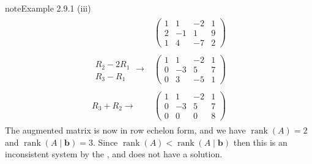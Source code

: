 \documentclass[letterpaper,10pt,english]{jupyterBook}
\begin{document}
\begin{sphinxadmonition}{note}{Example 2.9.1}
\sphinxAtStartPar
(iii)
\begin{equation*}
\begin{split} \begin{align*}
    & \left( \begin{array}{ccc|c}
        1 & 1 & -2 & 1 \\
        2 & -1 & 1 & 9 \\
        1 & 4 & -7 & 2 
    \end{array} \right) 
    \\ \\
    \begin{array}{l} \\ R_2 - 2R_1 \\ R_3 - R_1 \end{array} \longrightarrow &
    \left( \begin{array}{ccc|c}
        1 & 1 & -2 & 1 \\
        0 & -3 & 5 & 7 \\
        0 & 3 & -5 & 1 
    \end{array} \right)
    \\ \\
    R_3 + R_2 \longrightarrow &
    \left( \begin{array}{ccc|c}
        1 & 1 & -2 & 1 \\
        0 & -3 & 5 & 7 \\
        0 & 0 & 0 & 8
    \end{array} \right)
\end{align*} \end{split}
\end{equation*}
\sphinxAtStartPar
The augmented matrix is now in row echelon form, and we have \(\operatorname{rank}(A) = 2\) and \(\operatorname{rank}(A \mid \mathbf{b}) = 3\). Since \(\operatorname{rank}(A) < \operatorname{rank}(A \mid \mathbf{b})\) then this is an inconsistent system by the {\hyperref[\detokenize{_pages/2.6_Consistent_systems:inconsistent-system-theorem}]{}}, and does not have a solution.
\end{sphinxadmonition}

\sphinxstepscope

\ignorespaces 
{}\ignorespaces 
\end{document}
